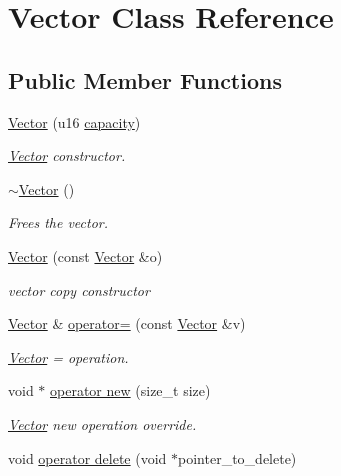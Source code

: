 \hypertarget{class_vector}{}\section{Vector Class Reference}
\label{class_vector}
\subsection*{Public Member Functions}
\begin{DoxyCompactItemize}
\item 
\hyperlink{class_vector_a9467d86e33600527022d24e2c55bd898}{Vector} (u16 \hyperlink{class_vector_a8f7d8bd11c88b8373e10fd1650ec17fb}{capacity})
\begin{DoxyCompactList}\small\item\em \hyperlink{class_vector}{Vector} constructor. \end{DoxyCompactList}\item 
\hyperlink{class_vector_a2eb3c49587a4f12cade7895ccb73f6a0}{$\sim$\+Vector} ()
\begin{DoxyCompactList}\small\item\em Frees the vector. \end{DoxyCompactList}\item 
\hyperlink{class_vector_a1a09f0b714eb24c7484ee55aaf308c92}{Vector} (const \hyperlink{class_vector}{Vector} \&o)
\begin{DoxyCompactList}\small\item\em vector copy constructor \end{DoxyCompactList}\item 
\hyperlink{class_vector}{Vector} \& \hyperlink{class_vector_ae48c467a9f65d60e2f7455aba4ca1239}{operator=} (const \hyperlink{class_vector}{Vector} \&v)
\begin{DoxyCompactList}\small\item\em \hyperlink{class_vector}{Vector} = operation. \end{DoxyCompactList}\item 
void $\ast$ \hyperlink{class_vector_a8c34a3b143a7007d8f264cce5d2e3a25}{operator new} (size\+\_\+t size)
\begin{DoxyCompactList}\small\item\em \hyperlink{class_vector}{Vector} new operation override. \end{DoxyCompactList}\item 
void \hyperlink{class_vector_a014c3802d82fb8348bd39ad7dcf9fcc5}{operator delete} (void $\ast$pointer\+\_\+to\+\_\+delete)

\end{DoxyCompactItemize}
